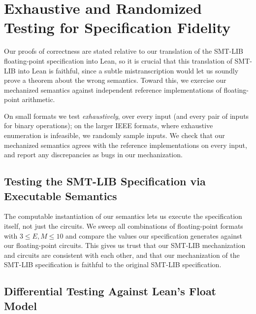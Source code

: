 \section{Exhaustive and Randomized Testing for Specification Fidelity}
\label{sec:fp:testing}

Our proofs of correctness are stated relative to our translation of the SMT-LIB
floating-point specification into Lean, so it is crucial that this translation of SMT-LIB into Lean is faithful,
since a subtle mistranscription would let us soundly prove a theorem about the wrong semantics.
Toward this, we exercise our mechanized semantics against independent reference implementations of floating-point arithmetic.

On small formats we test \emph{exhaustively}, over every input (and every
pair of inputs for binary operations); on the larger IEEE formats, where exhaustive
enumeration is infeasible, we randomly sample inputs.
We check that our mechanized semantics agrees with the reference implementations
on every input, and report any discrepancies as bugs in our mechanization.

\subsection{Testing the SMT-LIB Specification via Executable Semantics}

The computable instantiation of our semantics lets us execute the specification itself, not just the circuits.
We sweep all combinations of floating-point formats with
$3 \leq E, M \leq 10$ and compare the values our specification generates
against our floating-point circuits. This gives us trust that our SMT-LIB mechanization and circuits
are consistent with each other, and that our mechanization of the SMT-LIB specification is faithful to the original SMT-LIB specification.

\subsection{Differential Testing Against Lean's Float Model}

